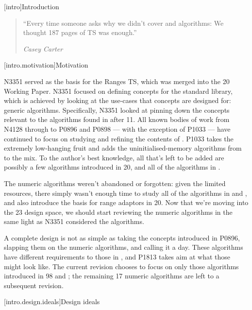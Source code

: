 [intro]{Introduction}

\begin{quote}
``Every time someone asks why we didn't cover  and  algorithms: We
thought 187 pages of TS was enough.''
\begin{flushright}
\textemdash \textit{Casey Carter}
\end{flushright}
\end{quote}

[intro.motivation]{Motivation}

N3351\cite{N3351} served as the basis for the Ranges TS\cite{N4685}, which was merged into the
\Cpp{}20 Working Paper\cite{P0898}\cite{P0896}. N3351 focused on defining concepts for the standard
library, which is achieved by looking at the use-cases that concepts are designed for: generic
algorithms. Specifically, N3351 looked at pinning down the concepts relevant to the algorithms found
in  after \Cpp{}11. All known bodies of work from N4128\cite{N4128} through to
P0896 and P0898 --- with the exception of P1033\cite{P1033} --- have continued to focus on studying
and refining the contents of . P1033 takes the extremely low-hanging fruit and
adds the uninitialised-memory algorithms from  to the mix. To the author's best
knowledge, all that's left to be added are possibly a few algorithms introduced in \Cpp{}20, and all
of the algorithms in .

The numeric algorithms weren't abandoned or forgotten: given the limited resources, there simply
wasn't enough time to study all of the algorithms in  and , and
also introduce the basis for range adaptors in \Cpp{}20. Now that we're moving into the \Cpp{}23
design space, we should start reviewing the numeric algorithms in the same light as N3351 considered
the  algorithms.

A complete design is not as simple as taking the concepts introduced in P0896, slapping them on the
numeric algorithms, and calling it a day. These algorithms have different requirements to those in
, and P1813 takes aim at what those might look like. The current revision chooses
to focus on only those algorithms introduced in \Cpp{}98 and ; the remaining \Cpp{}17
numeric algorithms are left to a subsequent revision.

[intro.design.ideals]{Design ideals}

